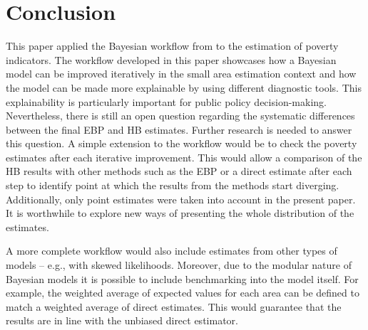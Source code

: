 \chapter{Conclusion}

This paper applied the Bayesian workflow from \cite{gelman_bayesian_2020} to the estimation of poverty indicators.
The workflow developed in this paper showcases how a Bayesian model can be improved iteratively in the small area estimation context and how the model can be made more explainable by using different diagnostic tools.
This explainability is particularly important for public policy decision-making.
Nevertheless, there is still an open question regarding the systematic differences between the final EBP and HB estimates.
Further research is needed to answer this question.
A simple extension to the workflow would be to check the poverty estimates after each iterative improvement.
This would allow a comparison of the HB results with other methods such as the EBP or a direct estimate after each step to identify point at which the results from the methods start diverging.
Additionally, only point estimates were taken into account in the present paper.
It is worthwhile to explore new ways of presenting the whole distribution of the estimates.

A more complete workflow would also include estimates from other types of models – e.g., with skewed likelihoods.
Moreover, due to the modular nature of Bayesian models it is possible to include benchmarking \citep{pfeffermann_new_2013} into the model itself.
For example, the weighted average of expected values for each area can be defined to match a weighted average of direct estimates.
This would guarantee that the results are in line with the unbiased direct estimator.
